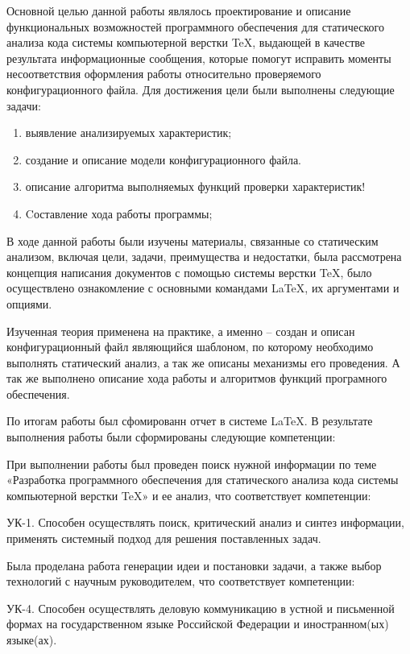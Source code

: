 \conclusion
Основной целью данной работы являлось проектирование и описание функциональных возможностей программного обеспечения для статического анализа кода системы компьютерной верстки TeX, выдающей в качестве результата информационные сообщения, которые помогут исправить моменты несоответствия оформления работы относительно проверяемого конфигурационного файла. Для достижения цели были выполнены следующие задачи:
    \begin{enumerate}    
    \item выявление анализируемых характеристик;    
    \item создание и описание модели конфигурационного файла.
    \item описание алгоритма выполняемых функций проверки характеристик!   
    \item Cоставление хода работы программы;
    \end{enumerate}

В ходе данной работы были изучены материалы, связанные со статическим анализом, включая цели, задачи, преимущества и недостатки, была рассмотрена концепция написания документов с помощью системы верстки \TeX, было осуществлено ознакомление с основными командами \LaTeX, их аргументами и опциями. 

Изученная теория применена на практике, а именно – создан и описан конфигурационный файл являющийся шаблоном, по которому необходимо выполнять статический анализ, а так же описаны механизмы его проведения. А так же выполнено описание хода работы и алгоритмов функций програмного обеспечения.

По итогам работы был сфомированн отчет в системе \LaTeX.
В результате выполнения работы были сформированы следующие компетенции: 

При выполнении работы был проведен поиск нужной информации по теме «Разработка программного обеспечения для статического анализа кода системы компьютерной верстки TeX» и ее анализ,  что соответствует компетенции: 

УК-1. Способен осуществлять поиск, критический анализ и синтез информации, применять системный подход для решения поставленных задач.

Была проделана работа генерации идеи и постановки задачи, а также
выбор технологий с научным руководителем, что соответствует компетенции:

УК-4. Способен осуществлять деловую коммуникацию в устной и письменной формах на государственном языке Российской Федерации и иностранном(ых) языке(ах).

